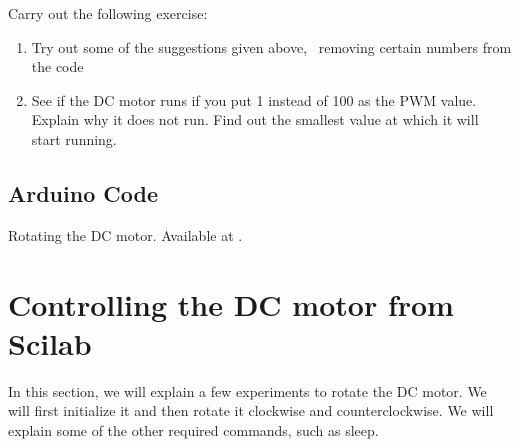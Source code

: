 \begin{exercise}
Carry out the following exercise:
\begin{enumerate}
\item Try out some of the suggestions given above, \ie\ removing
  certain numbers from the code
\item See if the DC motor runs if you put 1 instead of 100 as the PWM
  value.  Explain why it does not run.  Find out the smallest value at
  which it will start running.
\end{enumerate}
\end{exercise}

\subsection{Arduino Code}
\label{sec:dcmotor-arduino-code}
\lstset{style=mystyle}

\begin{ardcode}
{Rotating the DC motor.  Available at
  .}
\label{ard:dcmotor-clock}

\end{ardcode}

\begin{ardcode}
\label{ard:dcmotor-both}

\end{ardcode}

\begin{ardcode}
\label{ard:dcmotor-loop}

\end{ardcode}




\section{Controlling the DC motor from Scilab}
\label{sec:dcm-sci}
In this section, we will explain a few experiments to rotate the DC
motor.  We will first initialize it and then rotate it clockwise and
counterclockwise.  We will explain some of the other required
commands, such as sleep.

